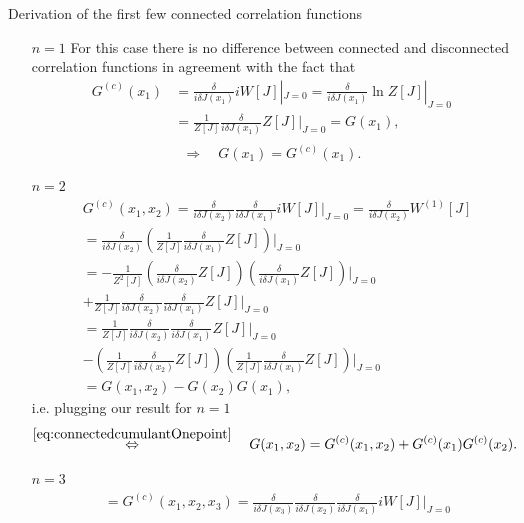 Derivation of the first few connected correlation functions
\begin{enumerate}
	\item[$n=1$] For this case there is no difference between connected and disconnected correlation functions in agreement with the fact that
	\begin{align*}
		G^{(c)} (x_1)&= \frac{\delta}{i \delta J(x_1)} i W[J] |_{J=0} = \frac{\delta}{i \delta J(x_1)} \ln Z[J] |_{J=0} \\
		&= \frac{1}{Z[J]} \frac{\delta}{i\delta J(x_1)} Z[J] |_{J=0} = G(x_1),\\
	\end{align*}
\begin{equation}
	\label{eq:connectedcumulantOnepoint}
			\Rightarrow \quad G(x_1) =G^{(c)}(x_1).
\end{equation}
\item[$n=2$] 
\begin{align*}
	&G^{(c)}(x_1,x_2) = \frac{\delta}{i \delta J(x_2)} \frac{\delta }{i \delta J(x_1)} iW[J] |_{J=0} = \frac{\delta}{i \delta J(x_2)} W^{(1)}[J] \\
	&= \frac{\delta}{i \delta J(x_2)} \left(\frac{1}{Z[J]} \frac{\delta}{i\delta J(x_1)} Z[J]\right) |_{J=0}\\
	&= -\frac{1}{Z^2[J]} \left(\frac{\delta}{i\delta J(x_2)} Z[J]\right) \left(\frac{\delta}{i \delta J(x_1)} Z[J]\right) |_{J=0} \\
	&+ \frac{1}{Z[J]} \frac{\delta}{i \delta J(x_2)}\frac{\delta}{i \delta J(x_1)} Z[J] |_{J=0} \\
	&= \frac{1}{Z[J]} \frac{\delta}{i\delta J(x_2) } \frac{\delta}{i \delta J(x_1)} Z[J] |_{J=0} \\
	&- \left(\frac{1}{Z[J]} \frac{\delta }{i \delta J(x_2)} Z[J]\right) \left(\frac{1}{Z[J]}\frac{\delta}{i \delta J(x_1)} Z[J]\right)|_{J=0}\\
	&= G(x_1,x_2) - G(x_2)G(x_1),
\end{align*}
i.e. plugging our result for $n=1$
\begin{equation}
\label{eq:connectedcumulantTwopoint}
	\stackrel{\ref{eq:connectedcumulantOnepoint}}{\Leftrightarrow} \quad G(x_1,x_2) = G^{(c)}(x_1,x_2)+G^{(c)}(x_1) G^{(c)}(x_2).
\end{equation}
\item[$n=3$] 
\begin{align*}
	&=G^{(c)}(x_1,x_2,x_3) = \frac{\delta}{i \delta J(x_3)} \frac{\delta}{i \delta J(x_2)} \frac{\delta}{i \delta J(x_1)} i W[J]|_{J=0}\\

\end{align*}
\end{enumerate}
